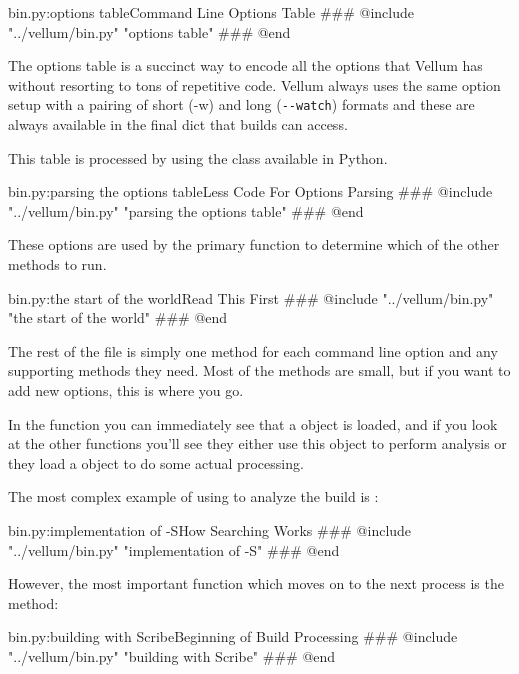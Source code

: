 \begin{code}{bin.py:options table}{Command Line Options Table}
### @include "../vellum/bin.py" "options table"
### @end
\end{code}

The options table is a succinct way to encode all the options that Vellum has
without resorting to tons of repetitive code.  Vellum always uses the same
option setup with a pairing of short (-w) and long (\verb|--watch|) formats and these
are always available in the final  dict that builds can access.

This table is processed by  using the
 class available in Python.

\begin{code}{bin.py:parsing the options table}{Less Code For Options Parsing}
### @include "../vellum/bin.py" "parsing the options table"
### @end
\end{code}

These options are used by the primary  function to determine
which of the other methods to run.

\begin{code}{bin.py:the start of the world}{Read This First}
### @include "../vellum/bin.py" "the start of the world"
### @end
\end{code}

The rest of the file is simply one method for each command line option and any
supporting methods they need.  Most of the methods are small, but if you want to
add new options, this is where you go.

In the  function you can immediately see that a  object
is loaded, and if you look at the other functions you'll see they either use
this  object to perform analysis or they load a 
object to do some actual processing.

The most complex example of using  to analyze the build is
:

\begin{code}{bin.py:implementation of -S}{How Searching Works}
### @include "../vellum/bin.py" "implementation of -S"
### @end
\end{code}

However, the most important function which moves on to the next process is the
 method:

\begin{code}{bin.py:building with Scribe}{Beginning of Build Processing}
### @include "../vellum/bin.py" "building with Scribe"
### @end
\end{code}

